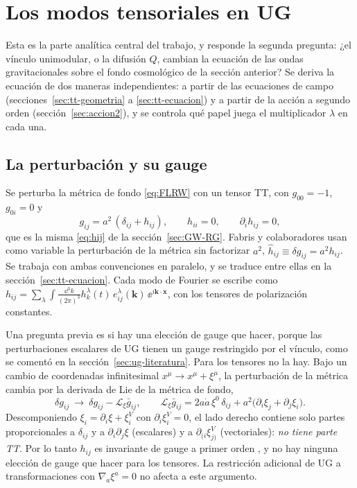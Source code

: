 \section{Los modos tensoriales en UG}
\label{sec:tensores}

Esta es la parte analítica central del trabajo, y responde la segunda pregunta: ¿el vínculo unimodular, o la difusión $Q$, cambian la ecuación de las ondas gravitacionales sobre el fondo cosmológico de la sección anterior? Se deriva la ecuación de dos maneras independientes: a partir de las ecuaciones de campo (secciones~\ref{sec:tt-geometria} a \ref{sec:tt-ecuacion}) y a partir de la acción a segundo orden (sección~\ref{sec:accion2}), y se controla qué papel juega el multiplicador $\lambda$ en cada una.

\subsection{La perturbación y su gauge}

Se perturba la métrica de fondo \eqref{eq:FLRW} con un tensor TT, con $g_{00}=-1$, $g_{0i}=0$ y
\begin{equation}
g_{ij}=a^2\,(\delta_{ij}+h_{ij}),\qquad h_{ii}=0,\qquad\partial_ih_{ij}=0,
\label{eq:hijbis}
\end{equation}
que es la misma \eqref{eq:hij} de la sección~\ref{sec:GW-RG}. Fabris y colaboradores \cite{fabris22} usan como variable la perturbación de la métrica sin factorizar $a^2$, $\hat h_{ij}\equiv\delta g_{ij}=a^2h_{ij}$. Se trabaja con ambas convenciones en paralelo, y se traduce entre ellas en la sección~\ref{sec:tt-ecuacion}. Cada modo de Fourier se escribe como $h_{ij}=\sum_\lambda\int\frac{\dd^3k}{(2\pi)^3}h^\lambda_k(t)\,e^\lambda_{ij}(\mathbf k)\,\ee^{i\mathbf k\cdot\mathbf x}$, con los tensores de polarización constantes.

Una pregunta previa es si hay una elección de gauge que hacer, porque las perturbaciones escalares de UG tienen un gauge restringido por el vínculo, como se comentó en la sección~\ref{sec:ug-literatura}. Para los tensores no la hay. Bajo un cambio de coordenadas infinitesimal $x^\mu\to x^\mu+\xi^\mu$, la perturbación de la métrica cambia por la derivada de Lie de la métrica de fondo,
\begin{equation}
\delta g_{ij}\ \to\ \delta g_{ij}-\mathcal L_\xi\bar g_{ij},\qquad
\mathcal L_\xi\bar g_{ij}=2a\dot a\,\xi^0\,\delta_{ij}+a^2\big(\partial_i\xi_j+\partial_j\xi_i\big).
\label{eq:gauge}
\end{equation}
Descomponiendo $\xi_i=\partial_i\xi+\xi^V_i$ con $\partial_i\xi^V_i=0$, el lado derecho contiene solo partes proporcionales a $\delta_{ij}$ y a $\partial_i\partial_j\xi$ (escalares) y a $\partial_{(i}\xi^V_{j)}$ (vectoriales): \emph{no tiene parte TT}. Por lo tanto $h_{ij}$ es invariante de gauge a primer orden , y no hay ninguna elección de gauge que hacer para los tensores. La restricción adicional de UG a transformaciones con $\nabla_a\xi^a=0$ no afecta a este argumento.

